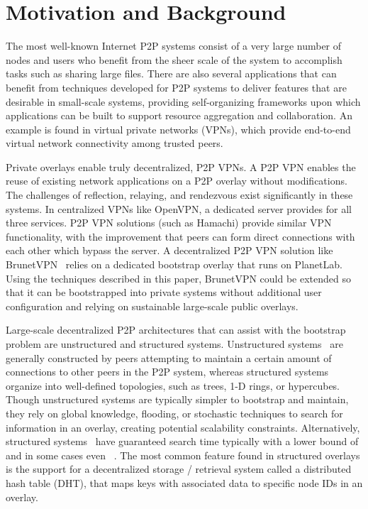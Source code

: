 \documentclass[conference]{IEEEtran}
\begin{document}
\section{Motivation and Background}
\label{background}

The most well-known Internet P2P systems consist of a very large number of
nodes and users who benefit from the sheer scale of the system to accomplish
tasks such as sharing large files. There are also several applications that can
benefit from techniques developed for P2P systems to deliver features that are
desirable in small-scale systems, providing self-organizing frameworks upon
which applications can be built to support resource aggregation and
collaboration.  An example is found in virtual private networks (VPNs), which
provide end-to-end virtual network connectivity among trusted peers.

Private overlays enable truly decentralized, P2P VPNs.  A P2P VPN enables the
reuse of existing network applications on a P2P overlay without modifications.
The challenges of reflection, relaying, and rendezvous exist significantly in
these systems.  In centralized VPNs like OpenVPN, a dedicated server provides
for all three services.  P2P VPN solutions (such as Hamachi) provide similar
VPN functionality, with the improvement that peers can form direct connections
with each other which bypass the server.  A decentralized P2P VPN solution like
BrunetVPN~\cite{socialvpn} relies on a dedicated bootstrap overlay that runs
on PlanetLab.  Using the techniques described in this paper, BrunetVPN could
be extended so that it can be bootstrapped into private systems without
additional user configuration and relying on sustainable large-scale public
overlays.

Large-scale decentralized P2P architectures that can assist with the bootstrap
problem are unstructured and structured systems.  Unstructured
systems~\cite{gnutella, fasttrack} are generally constructed by peers
attempting to maintain a certain amount of connections to other peers in the
P2P system, whereas structured systems organize into well-defined topologies,
such as trees, 1-D rings, or hypercubes.  Though unstructured systems are
typically simpler to bootstrap and maintain, they rely on global knowledge,
flooding, or stochastic techniques to search for information in an overlay,
creating potential scalability constraints.  Alternatively, structured
systems~\cite{pastry, chord, symphony, kademlia, can} have guaranteed search
time typically with a lower bound of  and in some cases even
~\cite{beehive}.  The most common feature found in structured overlays is
the support for a decentralized storage / retrieval system called a distributed
hash table (DHT), that maps keys with associated data to specific node IDs in
an overlay.  
\end{document}
